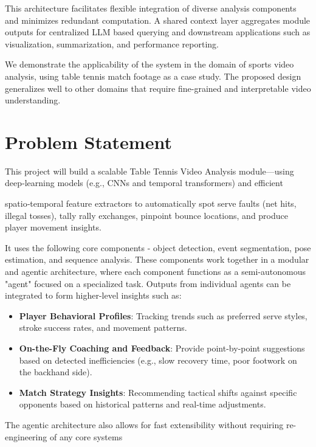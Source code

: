 \documentclass{article}
\begin{document}
This architecture facilitates flexible integration of diverse analysis components and minimizes redundant computation. A shared context layer aggregates module outputs for centralized LLM based querying and downstream applications such as visualization, summarization, and performance reporting.

We demonstrate the applicability of the system in the domain of sports video analysis, using table tennis match footage as a case study. The proposed design generalizes well to other domains that require fine-grained and interpretable video understanding.

\section{Problem Statement}

This project will build a scalable Table Tennis Video Analysis module—using deep‑learning models (e.g., CNNs and temporal transformers) and efficient 

spatio‑temporal feature extractors to automatically spot serve faults (net hits, illegal tosses), tally rally exchanges, pinpoint bounce locations, and produce player movement insights. 

It uses the following core components - object detection, event segmentation, pose estimation, and sequence analysis. These components work together in a modular and agentic architecture, where each component functions as a semi-autonomous "agent" focused on a specialized task. Outputs from individual agents can be integrated to form higher-level insights such as:

\begin{itemize}
    \item \textbf{Player Behavioral Profiles}: Tracking trends such as preferred serve styles, stroke success rates, and movement patterns.

    \item \textbf{On-the-Fly Coaching and Feedback}: Provide point-by-point suggestions based on detected inefficiencies (e.g., slow recovery time, poor footwork on the backhand side).

    \item \textbf{Match Strategy Insights}: Recommending tactical shifts against specific opponents based on historical patterns and real-time adjustments.
\end{itemize}
The agentic architecture also allows for fast extensibility without requiring re-engineering of any core systems
\end{document}
